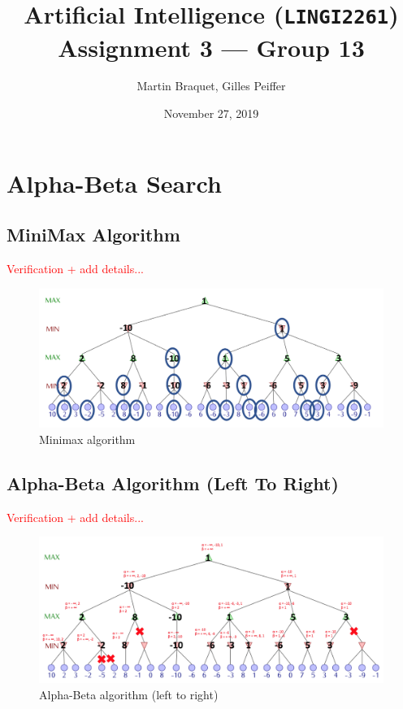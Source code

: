 \documentclass[journal,onecolumn]{IEEEtran}
\title{Artificial Intelligence (\texttt{LINGI2261}) \\ Assignment 3 --- Group 13}
\author{Martin Braquet, Gilles Peiffer}
\date{November 27, 2019}
\begin{document}
\maketitle

\section{Alpha-Beta Search}

\subsection{MiniMax Algorithm}

\textcolor{red}{Verification + add details...}

\begin{figure}[H]
 \centering
 \includegraphics[width=\textwidth]{img/MiniMax.png}
 \caption{Minimax algorithm}
 \label{fig:minimax}
\end{figure}


\subsection{Alpha-Beta Algorithm (Left To Right)}

\textcolor{red}{Verification + add details...}

\begin{figure}[H]
 \centering
 \includegraphics[width=\textwidth]{img/Alphabeta.png}
 \caption{Alpha-Beta algorithm (left to right)}
 \label{fig:alphabeta}
\end{figure}
\end{document}
